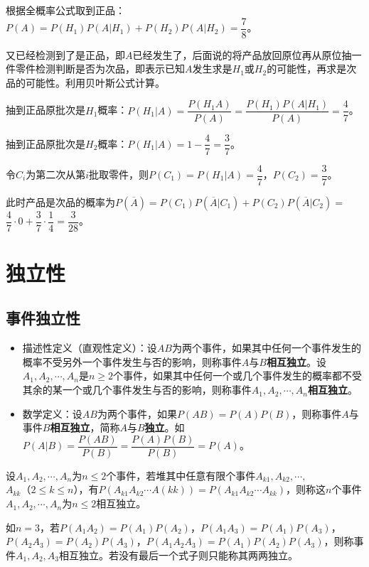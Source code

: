 \documentclass[UTF8, 12pt]{ctexart}
\begin{document}
根据全概率公式取到正品：$P(A)=P(H_1)P(A|H_1)+P(H_2)P(A|H_2)=\dfrac{7}{8}$。

又已经检测到了是正品，即$A$已经发生了，后面说的将产品放回原位再从原位抽一件零件检测判断是否为次品，即表示已知$A$发生求是$H_1$或$H_2$的可能性，再求是次品的可能性。利用贝叶斯公式计算。

抽到正品原批次是$H_1$概率：$P(H_1|A)=\dfrac{P(H_1A)}{P(A)}=\dfrac{P(H_1)P(A|H_1)}{P(A)}=\dfrac{4}{7}$。

抽到正品原批次是$H_2$概率：$P(H_1|A)=1-\dfrac{4}{7}=\dfrac{3}{7}$。

令$C_i$为第二次从第$i$批取零件，则$P(C_1)=P(H_1|A)=\dfrac{4}{7}$，$P(C_2)=\dfrac{3}{7}$。

此时产品是次品的概率为$P(\overline{A})=P(C_1)P(\overline{A}|C_1)+P(C_2)P(\overline{A}|C_2)=$\\$\dfrac{4}{7}\cdot0+\dfrac{3}{7}\cdot\dfrac{1}{4}=\dfrac{3}{28}$。

\section{独立性}

\subsection{事件独立性}

\begin{itemize}
    \item 描述性定义（直观性定义）：设$AB$为两个事件，如果其中任何一个事件发生的概率不受另外一个事件发生与否的影响，则称事件$A$与$B$\textbf{相互独立}。设$A_1,A_2,\cdots,A_n$是$n\geqslant2$个事件，如果其中任何一个或几个事件发生的概率都不受其余的某一个或几个事件发生与否的影响，则称事件$A_1,A_2,\cdots,A_n$\textbf{相互独立}。
    \item 数学定义：设$AB$为两个事件，如果$P(AB)=P(A)P(B)$，则称事件$A$与事件$B$\textbf{相互独立}，简称$A$与$B$\textbf{独立}。如$P(A|B)=\dfrac{P(AB)}{P(B)}=\dfrac{P(A)P(B)}{P(B)}=P(A)$。
\end{itemize}

设$A_1,A_2,\cdots,A_n$为$n\leqslant2$个事件，若堆其中任意有限个事件$A_{k1},A_{k2},\cdots,$\\$A_{kk}$（$2\leqslant k\leqslant n$），有$P(A_{k1}A_{k2}\cdots A(kk))=P(A_{k1}A_{k2}\cdots A_{kk})$，则称这$n$个事件$A_1,A_2,\cdots,A_n$为$n\leqslant2$相互独立。

如$n=3$，若$P(A_1A_2)=P(A_1)P(A_2)$，$P(A_1A_3)=P(A_1)P(A_3)$，$P(A_2A_3)=P(A_2)P(A_3)$，$P(A_1A_2A_3)=P(A_1)P(A_2)P(A_3)$，则称事件$A_1,A_2,A_3$相互独立。若没有最后一个式子则只能称其两两独立。
\end{document}
